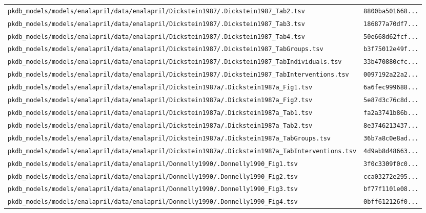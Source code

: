 \documentclass{article}
\begin{document}
\begin{longtable}{ll}
\texttt{pkdb\_models/models/enalapril/data/enalapril/Dickstein1987/.Dickstein1987\_Tab2.tsv} & \texttt{8800ba501668...} \\
\texttt{pkdb\_models/models/enalapril/data/enalapril/Dickstein1987/.Dickstein1987\_Tab3.tsv} & \texttt{186877a70df7...} \\
\texttt{pkdb\_models/models/enalapril/data/enalapril/Dickstein1987/.Dickstein1987\_Tab4.tsv} & \texttt{50e668d62fcf...} \\
\texttt{pkdb\_models/models/enalapril/data/enalapril/Dickstein1987/.Dickstein1987\_TabGroups.tsv} & \texttt{b3f75012e49f...} \\
\texttt{pkdb\_models/models/enalapril/data/enalapril/Dickstein1987/.Dickstein1987\_TabIndividuals.tsv} & \texttt{33b470880cfc...} \\
\texttt{pkdb\_models/models/enalapril/data/enalapril/Dickstein1987/.Dickstein1987\_TabInterventions.tsv} & \texttt{0097192a22a2...} \\
\texttt{pkdb\_models/models/enalapril/data/enalapril/Dickstein1987a/.Dickstein1987a\_Fig1.tsv} & \texttt{6a6fec999688...} \\
\texttt{pkdb\_models/models/enalapril/data/enalapril/Dickstein1987a/.Dickstein1987a\_Fig2.tsv} & \texttt{5e87d3c76c8d...} \\
\texttt{pkdb\_models/models/enalapril/data/enalapril/Dickstein1987a/.Dickstein1987a\_Tab1.tsv} & \texttt{fa2a3741b86b...} \\
\texttt{pkdb\_models/models/enalapril/data/enalapril/Dickstein1987a/.Dickstein1987a\_Tab2.tsv} & \texttt{8e3746213437...} \\
\texttt{pkdb\_models/models/enalapril/data/enalapril/Dickstein1987a/.Dickstein1987a\_TabGroups.tsv} & \texttt{36b7a8c0e8ad...} \\
\texttt{pkdb\_models/models/enalapril/data/enalapril/Dickstein1987a/.Dickstein1987a\_TabInterventions.tsv} & \texttt{4d9ab8d48663...} \\
\texttt{pkdb\_models/models/enalapril/data/enalapril/Donnelly1990/.Donnelly1990\_Fig1.tsv} & \texttt{3f0c3309f0c0...} \\
\texttt{pkdb\_models/models/enalapril/data/enalapril/Donnelly1990/.Donnelly1990\_Fig2.tsv} & \texttt{cca03272e295...} \\
\texttt{pkdb\_models/models/enalapril/data/enalapril/Donnelly1990/.Donnelly1990\_Fig3.tsv} & \texttt{bf77f1101e08...} \\
\texttt{pkdb\_models/models/enalapril/data/enalapril/Donnelly1990/.Donnelly1990\_Fig4.tsv} & \texttt{0bff612126f0...} \\

\end{longtable}
\end{document}
